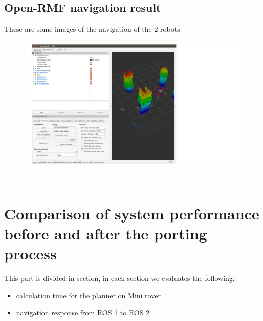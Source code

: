 \section{Open-RMF navigation result}
These are some images of the navigation of the 2 robots\\
\begin{figure}[h]
\centering
\includegraphics[width=0.7\linewidth]{img/rviz.png}
\end{figure}\\

\chapter{Comparison of system performance before and after the porting process}
This part is divided in section, in each section we evaluates the following:
\begin{itemize}
	\item calculation time for the planner on Mini rover
	\item navigation response from ROS 1 to ROS 2
\end{itemize}

